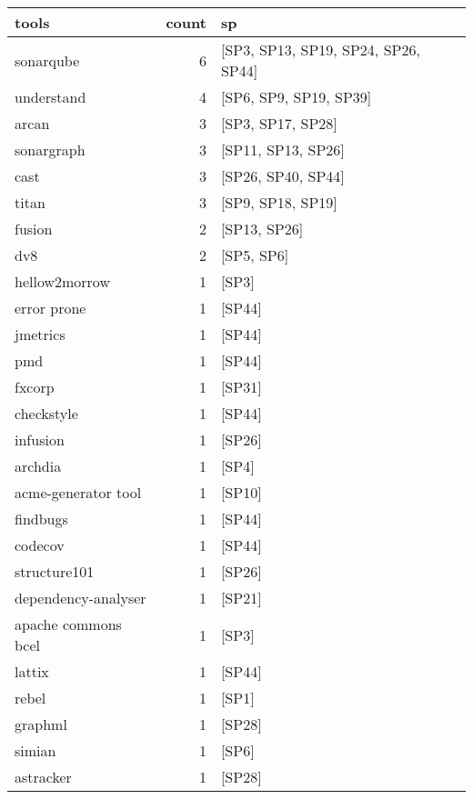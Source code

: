 \begin{tabular}{lrl}
\toprule
               tools &  count &                                   sp \\
\midrule
           sonarqube &      6 &  [SP3, SP13, SP19, SP24, SP26, SP44] \\
          understand &      4 &               [SP6, SP9, SP19, SP39] \\
               arcan &      3 &                    [SP3, SP17, SP28] \\
          sonargraph &      3 &                   [SP11, SP13, SP26] \\
                cast &      3 &                   [SP26, SP40, SP44] \\
               titan &      3 &                    [SP9, SP18, SP19] \\
              fusion &      2 &                         [SP13, SP26] \\
                 dv8 &      2 &                           [SP5, SP6] \\
       hellow2morrow &      1 &                                [SP3] \\
         error prone &      1 &                               [SP44] \\
            jmetrics &      1 &                               [SP44] \\
                 pmd &      1 &                               [SP44] \\
              fxcorp &      1 &                               [SP31] \\
          checkstyle &      1 &                               [SP44] \\
            infusion &      1 &                               [SP26] \\
             archdia &      1 &                                [SP4] \\
 acme-generator tool &      1 &                               [SP10] \\
            findbugs &      1 &                               [SP44] \\
             codecov &      1 &                               [SP44] \\
        structure101 &      1 &                               [SP26] \\
 dependency-analyser &      1 &                               [SP21] \\
 apache commons bcel &      1 &                                [SP3] \\
              lattix &      1 &                               [SP44] \\
               rebel &      1 &                                [SP1] \\
             graphml &      1 &                               [SP28] \\
              simian &      1 &                                [SP6] \\
           astracker &      1 &                               [SP28] \\
\bottomrule
\end{tabular}
